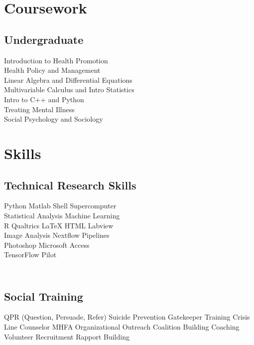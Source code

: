 \documentclass[]{deedy-resume-openfont}
\begin{document}
\begin{minipage}[t]{0.33\textwidth}
\section{Coursework}
\subsection{Undergraduate}
Introduction to Health Promotion \\
Health Policy and Management \\
Linear Algebra and Differential Equations \\
Multivariable Calculus and Intro Statistics \\
Intro to C++ and Python \\
Treating Mental Illness  \\
Social Psychology and Sociology 
\sectionsep


\section{Skills}
\subsection{Technical Research Skills}
Python \textbullet{} Matlab \textbullet{} Shell \textbullet{} Supercomputer \\ Statistical Analysis \textbullet{} Machine Learning \\ R \textbullet{} Qualtrics \textbullet{} \LaTeX{} \textbullet{} HTML \textbullet{} Labview \\ Image Analysis \textbullet{} Nextflow Pipelines \\ Photoshop \textbullet{} Microsoft Access \\ TensorFlow \textbullet{} Pilot 

\subsection{\\Social Training}
QPR (Question, Persuade, Refer) \textbullet{} Suicide Prevention Gatekeeper Training \textbullet{} Crisis Line Counselor \textbullet{} MHFA \textbullet{}
Organizational Outreach \textbullet{} Coalition Building \textbullet{} Coaching \\ Volunteer Recruitment \textbullet{} Rapport Building



\end{minipage}
\end{document}
